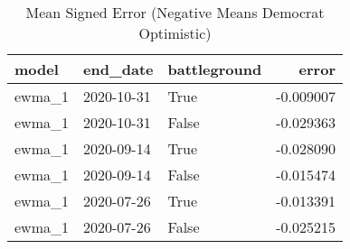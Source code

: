 \begin{table}
\centering
\caption{Mean Signed Error
(Negative Means Democrat Optimistic)}
\begin{tabular}{lllr}
\toprule
  model &    end\_date &  battleground &     error \\
\midrule
 ewma\_1 &  2020-10-31 &          True & -0.009007 \\
 ewma\_1 &  2020-10-31 &         False & -0.029363 \\
 ewma\_1 &  2020-09-14 &          True & -0.028090 \\
 ewma\_1 &  2020-09-14 &         False & -0.015474 \\
 ewma\_1 &  2020-07-26 &          True & -0.013391 \\
 ewma\_1 &  2020-07-26 &         False & -0.025215 \\
\bottomrule
\end{tabular}
\end{table}
